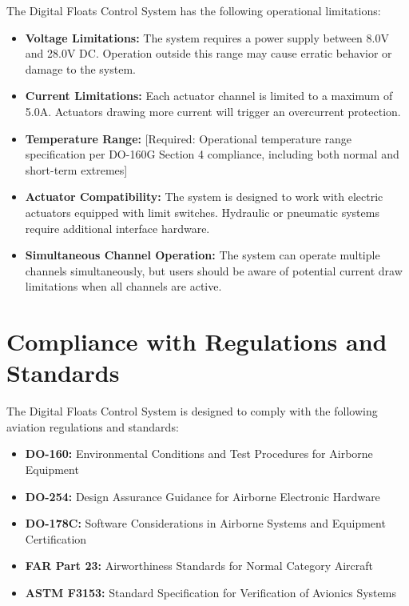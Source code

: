 \documentclass[12pt,a4paper,twoside,openright]{book}
\begin{document}
The Digital Floats Control System has the following operational limitations:

\begin{itemize}
    \item \textbf{Voltage Limitations:} The system requires a power supply between 8.0V and 28.0V DC. Operation outside this range may cause erratic behavior or damage to the system.
    
    \item \textbf{Current Limitations:} Each actuator channel is limited to a maximum of 5.0A. Actuators drawing more current will trigger an overcurrent protection.
    
    \item \textbf{Temperature Range:} {\color{missingred}[Required: Operational temperature range specification per DO-160G Section 4 compliance, including both normal and short-term extremes]}
    
    \item \textbf{Actuator Compatibility:} The system is designed to work with electric actuators equipped with limit switches. Hydraulic or pneumatic systems require additional interface hardware.
    
    \item \textbf{Simultaneous Channel Operation:} The system can operate multiple channels simultaneously, but users should be aware of potential current draw limitations when all channels are active.
\end{itemize}

\section{Compliance with Regulations and Standards}

The Digital Floats Control System is designed to comply with the following aviation regulations and standards:

\begin{itemize}
    \item \textbf{DO-160:} Environmental Conditions and Test Procedures for Airborne Equipment
    \item \textbf{DO-254:} Design Assurance Guidance for Airborne Electronic Hardware
    \item \textbf{DO-178C:} Software Considerations in Airborne Systems and Equipment Certification
    \item \textbf{FAR Part 23:} Airworthiness Standards for Normal Category Aircraft
    \item \textbf{ASTM F3153:} Standard Specification for Verification of Avionics Systems
\end{itemize}
\end{document}
